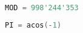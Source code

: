 \begin{lstlisting}[language=C++]
MOD = 998'244'353
\end{lstlisting}

\begin{lstlisting}[language=C++]
PI = acos(-1)
\end{lstlisting}
